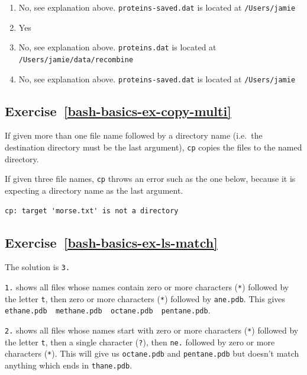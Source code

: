 \documentclass[
]{krantz}
\providecommand{\tightlist}{%
  \setlength{\itemsep}{0pt}\setlength{\parskip}{0pt}}
\begin{document}
\begin{enumerate}
\def\labelenumi{\arabic{enumi}.}
\tightlist
\item
  No, see explanation above. \texttt{proteins-saved.dat} is located at \texttt{/Users/jamie}
\item
  Yes
\item
  No, see explanation above. \texttt{proteins.dat} is located at \texttt{/Users/jamie/data/recombine}
\item
  No, see explanation above. \texttt{proteins-saved.dat} is located at \texttt{/Users/jamie}
\end{enumerate}

\hypertarget{exercise-refbash-basics-ex-copy-multi}{%
\subsection*{Exercise~\ref{bash-basics-ex-copy-multi}}\label{exercise-refbash-basics-ex-copy-multi}}


If given more than one file name followed by a directory name (i.e.~the destination directory must
be the last argument), \texttt{cp} copies the files to the named directory.

If given three file names, \texttt{cp} throws an error such as the one below, because it is expecting a directory
name as the last argument.

\begin{verbatim}
cp: target 'morse.txt' is not a directory
\end{verbatim}

\hypertarget{exercise-refbash-basics-ex-ls-match}{%
\subsection*{Exercise~\ref{bash-basics-ex-ls-match}}\label{exercise-refbash-basics-ex-ls-match}}


The solution is \texttt{3.}

\texttt{1.} shows all files whose names contain zero or more characters (\texttt{*}) followed by the letter \texttt{t},
then zero or more characters (\texttt{*}) followed by \texttt{ane.pdb}.
This gives \texttt{ethane.pdb\ \ methane.pdb\ \ octane.pdb\ \ pentane.pdb}.

\texttt{2.} shows all files whose names start with zero or more characters (\texttt{*}) followed by the letter \texttt{t},
then a single character (\texttt{?}), then \texttt{ne.} followed by zero or more characters (\texttt{*}).
This will give us \texttt{octane.pdb} and \texttt{pentane.pdb} but doesn't match anything which ends in \texttt{thane.pdb}.
\end{document}
